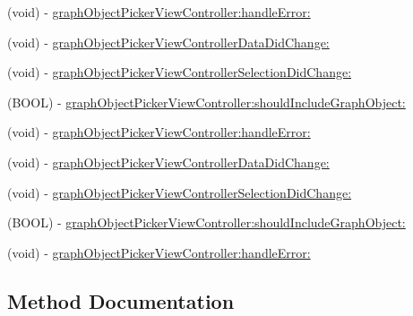 \begin{DoxyCompactItemize}
\item 
(void) -\/ \hyperlink{protocolFBGraphObjectPickerDelegate_01-p_a99107978ecbc60a1a7daeeb2367d5cbf}{graph\+Object\+Picker\+View\+Controller\+:handle\+Error\+:}
\item 
(void) -\/ \hyperlink{protocolFBGraphObjectPickerDelegate_01-p_a7444276f3c20567235206a1be36074cb}{graph\+Object\+Picker\+View\+Controller\+Data\+Did\+Change\+:}
\item 
(void) -\/ \hyperlink{protocolFBGraphObjectPickerDelegate_01-p_a7c9da228bb329ef648df31794c7c7113}{graph\+Object\+Picker\+View\+Controller\+Selection\+Did\+Change\+:}
\item 
(B\+O\+OL) -\/ \hyperlink{protocolFBGraphObjectPickerDelegate_01-p_a52f34860c89cd1f02c6c4604bbf30629}{graph\+Object\+Picker\+View\+Controller\+:should\+Include\+Graph\+Object\+:}
\item 
(void) -\/ \hyperlink{protocolFBGraphObjectPickerDelegate_01-p_a99107978ecbc60a1a7daeeb2367d5cbf}{graph\+Object\+Picker\+View\+Controller\+:handle\+Error\+:}
\item 
(void) -\/ \hyperlink{protocolFBGraphObjectPickerDelegate_01-p_a7444276f3c20567235206a1be36074cb}{graph\+Object\+Picker\+View\+Controller\+Data\+Did\+Change\+:}
\item 
(void) -\/ \hyperlink{protocolFBGraphObjectPickerDelegate_01-p_a7c9da228bb329ef648df31794c7c7113}{graph\+Object\+Picker\+View\+Controller\+Selection\+Did\+Change\+:}
\item 
(B\+O\+OL) -\/ \hyperlink{protocolFBGraphObjectPickerDelegate_01-p_a52f34860c89cd1f02c6c4604bbf30629}{graph\+Object\+Picker\+View\+Controller\+:should\+Include\+Graph\+Object\+:}
\item 
(void) -\/ \hyperlink{protocolFBGraphObjectPickerDelegate_01-p_a99107978ecbc60a1a7daeeb2367d5cbf}{graph\+Object\+Picker\+View\+Controller\+:handle\+Error\+:}
\end{DoxyCompactItemize}


\subsection{Method Documentation}
\mbox{\label{protocolFBGraphObjectPickerDelegate_01-p_a99107978ecbc60a1a7daeeb2367d5cbf}} 
